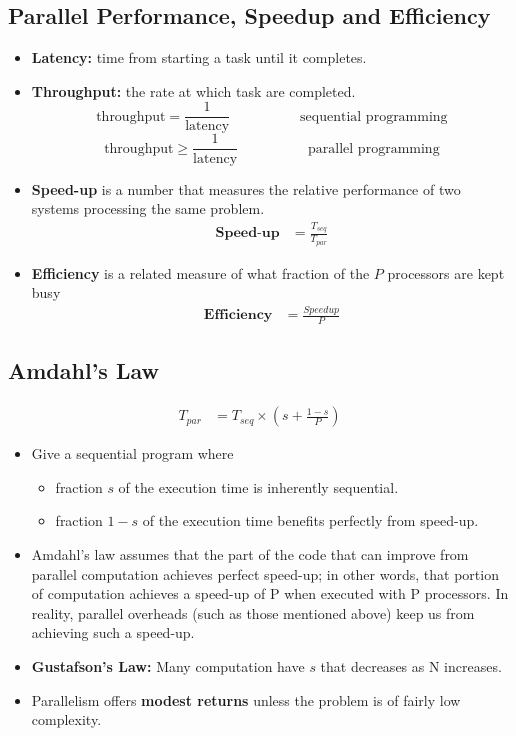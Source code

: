 \documentclass[../main.tex]{subfiles}
\begin{document}
\subsection{Parallel Performance, Speedup and Efficiency}

\begin{itemize}
	\item \textbf{Latency:} time from starting a task until it completes.
	\item \textbf{Throughput:} the rate at which task are completed.
	      \[
		      \text{throughput}  = \frac{1}{\text{latency}}   \hspace{5em}  \text{sequential programming}
	      \]
	      \[
		      \text{throughput}  \geq \frac{1}{\text{latency}} \hspace{5em}\text{parallel programming}
	      \]
	\item \textbf{Speed-up} is a number that measures the relative performance of two systems processing the same problem.
	      \begin{align*}
		      \textbf{Speed-up} & = \frac{T_{seq}}{T_{par}}
	      \end{align*}
	\item \textbf{Efficiency} is a related measure of what fraction of the $P$ processors are kept busy
	      \begin{align*}
		      \textbf{Efficiency} & = \frac{Speedup}{P}
	      \end{align*}
\end{itemize}

\subsection{Amdahl's Law}

\begin{align*}
	T_{par} & = T_{seq} \times (s + \frac{1-s}{P})
\end{align*}

\begin{itemize}
	\item Give a sequential program where
	      \begin{itemize}
		      \item fraction \(s\) of the execution time is inherently sequential.
		      \item fraction \(1-s\) of the execution time benefits perfectly from speed-up.
	      \end{itemize}
	\item Amdahl’s law assumes that the part of the code that can improve from parallel computation achieves perfect speed-up; in other words, that portion of computation achieves a speed-up of P when executed with P processors. In reality, parallel overheads (such as those mentioned above) keep us from achieving such a speed-up.
	\item \textbf{Gustafson's Law:} Many computation have \(s\) that decreases as N increases.
	\item Parallelism offers \textbf{modest returns} unless the problem is of fairly low complexity.
\end{itemize}
\end{document}
